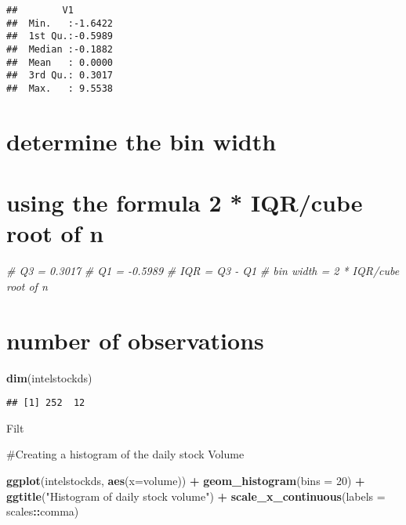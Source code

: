 \documentclass[
]{article}
\newenvironment{Shaded}{\begin{snugshade}}{\end{snugshade}}
\newcommand{\CommentTok}[1]{\textcolor[rgb]{0.56,0.35,0.01}{\textit{#1}}}
\newcommand{\DataTypeTok}[1]{\textcolor[rgb]{0.13,0.29,0.53}{#1}}
\newcommand{\DecValTok}[1]{\textcolor[rgb]{0.00,0.00,0.81}{#1}}
\newcommand{\KeywordTok}[1]{\textcolor[rgb]{0.13,0.29,0.53}{\textbf{#1}}}
\newcommand{\NormalTok}[1]{#1}
\newcommand{\OperatorTok}[1]{\textcolor[rgb]{0.81,0.36,0.00}{\textbf{#1}}}
\newcommand{\StringTok}[1]{\textcolor[rgb]{0.31,0.60,0.02}{#1}}
\begin{document}
\begin{verbatim}
##        V1         
##  Min.   :-1.6422  
##  1st Qu.:-0.5989  
##  Median :-0.1882  
##  Mean   : 0.0000  
##  3rd Qu.: 0.3017  
##  Max.   : 9.5538
\end{verbatim}

\hypertarget{determine-the-bin-width}{%
\section{determine the bin width}\label{determine-the-bin-width}}

\hypertarget{using-the-formula-2-iqrcube-root-of-n}{%
\section{using the formula 2 * IQR/cube root of
n}\label{using-the-formula-2-iqrcube-root-of-n}}

\begin{Shaded}
\begin{Highlighting}[]
\CommentTok{# Q3 = 0.3017  }
\CommentTok{# Q1 = -0.5989}
\CommentTok{# IQR = Q3 - Q1}
\CommentTok{# bin width  = 2 * IQR/cube root of n}
\end{Highlighting}
\end{Shaded}

\hypertarget{number-of-observations}{%
\section{number of observations}\label{number-of-observations}}

\begin{Shaded}
\begin{Highlighting}[]
\KeywordTok{dim}\NormalTok{(intelstockds)}
\end{Highlighting}
\end{Shaded}

\begin{verbatim}
## [1] 252  12
\end{verbatim}

Filt

\#Creating a histogram of the daily stock Volume

\begin{Shaded}
\begin{Highlighting}[]
\KeywordTok{ggplot}\NormalTok{(intelstockds, }\KeywordTok{aes}\NormalTok{(}\DataTypeTok{x=}\NormalTok{volume)) }\OperatorTok{+}\StringTok{ }
\StringTok{  }\KeywordTok{geom_histogram}\NormalTok{(}\DataTypeTok{bins =} \DecValTok{20}\NormalTok{) }\OperatorTok{+}\StringTok{ }
\StringTok{  }\KeywordTok{ggtitle}\NormalTok{(}\StringTok{"Histogram of daily stock volume"}\NormalTok{) }\OperatorTok{+}
\StringTok{  }\KeywordTok{scale_x_continuous}\NormalTok{(}\DataTypeTok{labels =}\NormalTok{ scales}\OperatorTok{::}\NormalTok{comma)}
\end{Highlighting}
\end{Shaded}
\end{document}
